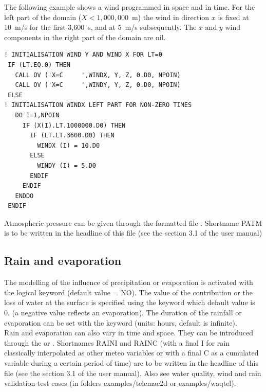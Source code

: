 The following example shows a wind programmed in space and in time.
For the left part of the domain ($ X < 1,000,000$~m) the wind in direction $x$
is fixed at 10~m/s for the first 3,600~s, and at 5~m/s subsequently.
The $x$ and $y$ wind components in the right part of the domain are nil.

\begin{lstlisting}[language=TelFortran]
! INITIALISATION WIND Y AND WIND X FOR LT=0
 IF (LT.EQ.0) THEN
   CALL OV ('X=C     ',WINDX, Y, Z, 0.D0, NPOIN)
   CALL OV ('X=C     ',WINDY, Y, Z, 0.D0, NPOIN)
 ELSE
! INITIALISATION WINDX LEFT PART FOR NON-ZERO TIMES
   DO I=1,NPOIN
     IF (X(I).LT.1000000.D0) THEN
       IF (LT.LT.3600.D0) THEN
         WINDX (I) = 10.D0
       ELSE
         WINDY (I) = 5.D0
       ENDIF
     ENDIF
   ENDDO
 ENDIF
\end{lstlisting}

Atmospheric pressure can be given through the formatted file
.
Shortname PATM is to be written in the headline of this file (see the section 3.1
of the \waqtel user manual)

\subsection{Rain and evaporation}

The modelling of the influence of precipitation or evaporation is activated
with the logical keyword  (default value = NO).
The value of the contribution or the loss of water at the surface is specified
using the keyword  which default value
is 0. (a negative value reflects an evaporation).
The duration of the rainfall or evaporation can be set with the keyword
 (units: hours, default is
infinite).\\

Rain and evaporation can also vary in time and space.
They can be introduced through the 
or .
Shortnames RAINI and RAINC (with a final I for rain classically interpolated as
other meteo variables or with a final C as a cumulated variable during a certain
period of time) are to be written in the headline of this file (see the section
3.1 of the \waqtel user manual).
Also see water quality, wind and rain validation test cases (in folders
examples/telemac2d or examples/waqtel).\\

